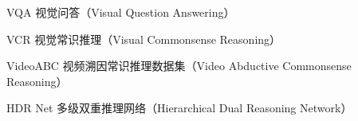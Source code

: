 
\begin{denotation}[3cm]
\item[VQA] 视觉问答（Visual Question Answering）
\item[VCR] 视觉常识推理（Visual Commonsense Reasoning）
\item[VideoABC] 视频溯因常识推理数据集（Video Abductive Commonsense Reasoning）
\item[HDR Net] 多级双重推理网络（Hierarchical Dual Reasoning Network） 
\end{denotation}